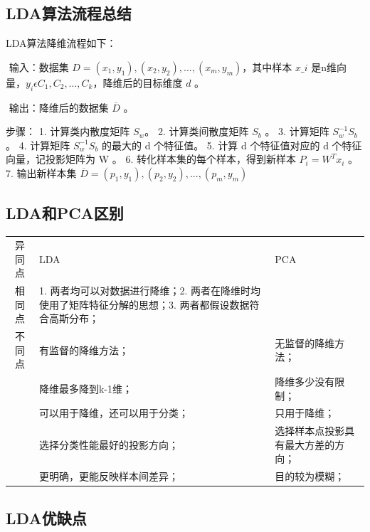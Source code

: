 \subsection{LDA算法流程总结}\label{ldaux7b97ux6cd5ux6d41ux7a0bux603bux7ed3}

LDA算法降维流程如下：

​ 输入：数据集
$D = { (x_1,y_1),(x_2,y_2), ... ,(x_m,y_m) }$，其中样本 $x\_i $
是n维向量，$y_i \epsilon {C_1, C_2, ..., C_k}$，降维后的目标维度
$d$ 。

​ 输出：降维后的数据集 $\overline{D} $ 。

步骤： 1. 计算类内散度矩阵 $S_w$。 2. 计算类间散度矩阵 $S_b​$ 。 3.
计算矩阵 $S^{-1}_wS_b​$ 。 4. 计算矩阵 $S^{-1}_wS_b$ 的最大的 d
个特征值。 5. 计算 d 个特征值对应的 d 个特征向量，记投影矩阵为 W 。 6.
转化样本集的每个样本，得到新样本 $P_i = W^Tx_i​$ 。 7. 输出新样本集
$\overline{D} = { (p_1,y_1),(p_2,y_2),...,(p_m,y_m) }​$

\subsection{LDA和PCA区别}\label{ldaux548cpcaux533aux522b}

\begin{longtable}[]{ cll }
异同点 & LDA & PCA\tabularnewline
相同点 & 1. 两者均可以对数据进行降维；2.
两者在降维时均使用了矩阵特征分解的思想；3. 两者都假设数据符合高斯分布；
&\tabularnewline
不同点 & 有监督的降维方法； & 无监督的降维方法；\tabularnewline
& 降维最多降到k-1维； & 降维多少没有限制；\tabularnewline
& 可以用于降维，还可以用于分类； & 只用于降维；\tabularnewline
& 选择分类性能最好的投影方向； &
选择样本点投影具有最大方差的方向；\tabularnewline
& 更明确，更能反映样本间差异； & 目的较为模糊；\tabularnewline
\end{longtable}

\subsection{ LDA优缺点}\label{ldaux4f18ux7f3aux70b9}

